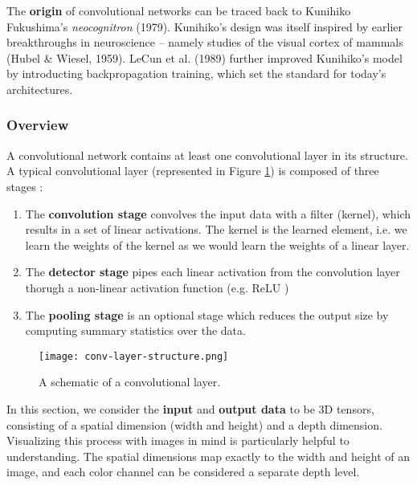 The \textbf{origin} of convolutional networks can be traced back to Kunihiko Fukushima's \emph{neocognitron} (1979).
Kunihiko’s design \cite{neocognitron-paper} was itself inspired by earlier breakthroughs in neuroscience -- namely studies of the visual cortex of mammals (Hubel \& Wiesel, 1959).
LeCun et al. (1989) further improved Kunihiko’s model by introducting backpropagation training, which set the standard for today’s architectures.

\subsubsection{Overview}
A convolutional network contains at least one convolutional layer in its structure.
A typical convolutional layer (represented in Figure \ref{fig:conv-layer}) is composed of three stages \cite{Goodfellow-et-al-2016}:
\begin{enumerate}
    \item The \textbf{convolution stage} convolves the input data with a filter (kernel), which results in a set of linear activations.
    The kernel is the learned element, i.e. we learn the weights of the kernel as we would learn the weights of a linear layer.
    \item The \textbf{detector stage} pipes each linear activation from the convolution layer thorugh a non-linear activation function (e.g. ReLU \footnotemark)
    \item The \textbf{pooling stage} is an optional stage which reduces the output size by computing summary statistics over the data.
\end{enumerate}

\begin{figure}[h]
    \centering
    \texttt{[image: conv-layer-structure.png]}
    \caption{A schematic of a convolutional layer.}
    \label{fig:conv-layer}
\end{figure}

In this section, we consider the \textbf{input} and \textbf{output data} to be 3D tensors, consisting of a spatial dimension (width and height) and a depth dimension.
Visualizing this process with images in mind is particularly helpful to understanding.
The spatial dimensions map exactly to the width and height of an image, and each color channel can be considered a separate depth level.


